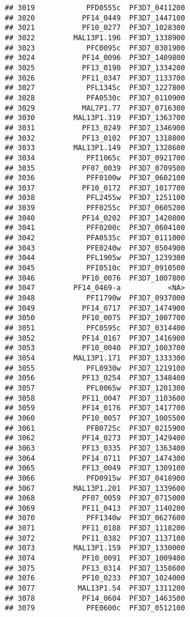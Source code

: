 \documentclass[12pt, a4paper]{article}\usepackage[]{graphicx}\usepackage[]{color}
\makeatletter
\newenvironment{kframe}{%
 \def\at@end@of@kframe{}%
 \ifinner\ifhmode%
  \def\at@end@of@kframe{\end{minipage}}%
  \begin{minipage}{\columnwidth}%
 \fi\fi%
 \def\FrameCommand##1{\hskip\@totalleftmargin \hskip-\fboxsep
 \colorbox{shadecolor}{##1}\hskip-\fboxsep
     \hskip-\linewidth \hskip-\@totalleftmargin \hskip\columnwidth}%
 \MakeFramed {\advance\hsize-\width
   \@totalleftmargin\z@ \linewidth\hsize
   \@setminipage}}%
 {\par\unskip\endMakeFramed%
 \at@end@of@kframe}
\newenvironment{knitrout}{}{} %
\makeatother
\begin{document}
\begin{knitrout}
\begin{kframe}
\begin{verbatim}
## 3019            PFD0555c  PF3D7_0411200
## 3020           PF14_0449  PF3D7_1447100
## 3021           PF10_0277  PF3D7_1028300
## 3022         MAL13P1.196  PF3D7_1338900
## 3023            PFC0095c  PF3D7_0301900
## 3024           PF14_0096  PF3D7_1409800
## 3025           PF13_0190  PF3D7_1334200
## 3026           PF11_0347  PF3D7_1133700
## 3027            PFL1345c  PF3D7_1227800
## 3028            PFA0530c  PF3D7_0110900
## 3029           MAL7P1.77  PF3D7_0716300
## 3030         MAL13P1.319  PF3D7_1363700
## 3031           PF13_0249  PF3D7_1346900
## 3032           PF13_0102  PF3D7_1318800
## 3033         MAL13P1.149  PF3D7_1328600
## 3034            PFI1065c  PF3D7_0921700
## 3035           PF07_0039  PF3D7_0709500
## 3036            PFF0100w  PF3D7_0602100
## 3037           PF10_0172  PF3D7_1017700
## 3038            PFL2455w  PF3D7_1251100
## 3039            PFF0255c  PF3D7_0605200
## 3040           PF14_0202  PF3D7_1420800
## 3041            PFF0200c  PF3D7_0604100
## 3042            PFA0535c  PF3D7_0111000
## 3043            PFE0240w  PF3D7_0504900
## 3044            PFL1905w  PF3D7_1239300
## 3045            PFI0510c  PF3D7_0910500
## 3046           PF10_0076  PF3D7_1007800
## 3047         PF14_0469-a           <NA>
## 3048            PFI1790w  PF3D7_0937000
## 3049           PF14_0717  PF3D7_1474900
## 3050           PF10_0075  PF3D7_1007700
## 3051            PFC0595c  PF3D7_0314400
## 3052           PF14_0167  PF3D7_1416900
## 3053           PF10_0040  PF3D7_1003700
## 3054         MAL13P1.171  PF3D7_1333300
## 3055            PFL0930w  PF3D7_1219100
## 3056           PF13_0254  PF3D7_1348400
## 3057            PFL0065w  PF3D7_1201300
## 3058           PF11_0047  PF3D7_1103600
## 3059           PF14_0176  PF3D7_1417700
## 3060           PF10_0057  PF3D7_1005500
## 3061            PFB0725c  PF3D7_0215900
## 3062           PF14_0273  PF3D7_1429400
## 3063           PF13_0335  PF3D7_1363400
## 3064           PF14_0711  PF3D7_1474300
## 3065           PF13_0049  PF3D7_1309100
## 3066            PFD0915w  PF3D7_0418900
## 3067         MAL13P1.201  PF3D7_1339600
## 3068           PF07_0059  PF3D7_0715000
## 3069           PF11_0413  PF3D7_1140200
## 3070            PFF1340w  PF3D7_0627600
## 3071           PF11_0188  PF3D7_1118200
## 3072           PF11_0382  PF3D7_1137100
## 3073         MAL13P1.159  PF3D7_1330000
## 3074           PF10_0091  PF3D7_1009400
## 3075           PF13_0314  PF3D7_1358600
## 3076           PF10_0233  PF3D7_1024000
## 3077          MAL13P1.54  PF3D7_1311200
## 3078           PF14_0604  PF3D7_1463500
## 3079            PFE0600c  PF3D7_0512100

\end{verbatim}
\end{kframe}
\end{knitrout}
\end{document}
